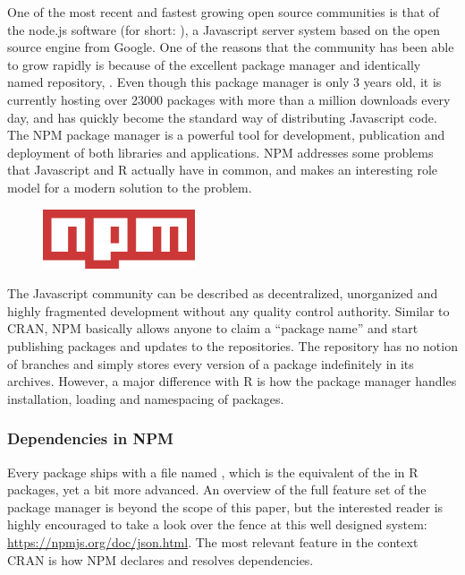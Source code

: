 One of the most recent and fastest growing open source communities is that of
the node.js software (for short: ), a Javascript server system based
on the open source engine  from Google. One of the reasons that the
community has been able to grow rapidly is because of the excellent package
manager and identically named repository, . Even though this package
manager is only 3 years old, it is currently hosting over 23000 packages with
more than a million downloads every day, and has quickly become the standard
way of distributing Javascript code. The NPM package manager is a powerful tool
for development, publication and deployment of both libraries and applications.
NPM addresses some problems that Javascript and R actually have in common, and
makes an interesting role model for a modern solution to the problem.\\

\begin{figure}[placement specifier]
\centering
\includegraphics[width=0.4\textwidth]{npm}
\end{figure}

\noindent The Javascript community can be described as decentralized,
unorganized and highly fragmented development without any quality control authority. Similar to
CRAN, NPM basically allows anyone to claim a ``package name'' and start
publishing packages and updates to the repositories. The repository has no
notion of branches and simply stores every version of a package indefinitely in
its archives. However, a major difference with R is how the package manager
handles installation, loading and namespacing of packages.

\subsubsection{Dependencies in NPM}

Every  package ships with a file named , which is
the equivalent of the  in R packages, yet a bit more advanced.
An overview of the full feature set of the package manager is beyond the scope
of this paper, but the interested reader is highly encouraged to take a look
over the fence at this well designed system: \url{https://npmjs.org/doc/json.html}.
The most relevant feature in the context CRAN is how NPM declares and resolves
dependencies.

